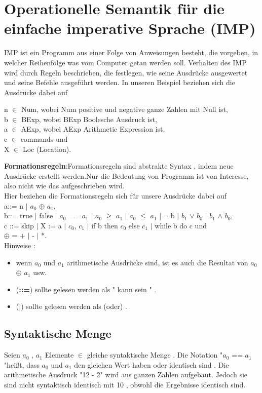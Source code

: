 \documentclass[a4paper,12pt,twoside,headsepline]{scrartcl}
\begin{document}
\section{Operationelle Semantik für die einfache imperative Sprache (IMP)}
IMP ist ein Programm aus einer Folge von Anweisungen besteht, die vorgeben, in welcher Reihenfolge was vom Computer getan werden soll.
 Verhalten des IMP  wird durch Regeln beschrieben, die festlegen, wie seine Ausdrücke ausgewertet und seine Befehle ausgeführt werden.
In unseren Beispiel beziehen sich die Ausdrücke dabei auf

n $\in$ Num, wobei Num positive und negative ganze Zahlen mit Null ist,\\
b $\in$ BExp, wobei BExp Boolesche Ausdruck ist,\\
a $\in$ AExp, wobei AExp Arithmetic Expression ist,\\
c $\in$ commands und\\
X $\in$ Loc    (Location).

		
			
\textbf{Formationsregeln}:Formationsregeln sind abstrakte Syntax , indem neue Ausdrücke erstellt werden.Nur die Bedeutung von Programm ist von Interesse, also nicht wie  das aufgeschrieben wird.\\
Hier beziehen die Formationsregeln sich für unsere Ausdrücke dabei auf\\
	
a::= n $\mid$ $a_0$ $\oplus$ $a_1$,\\
b::= true $\mid$ false $\mid$ $a_0$ == $a_1$ $\mid$ $a_0$ $\geq$ $a_1$ $\mid$ $a_0$ $\leq$ $a_1$ $\mid$ $\neg$ b $\mid$ $b_1$ $\vee$ $b_0$ $\mid$ $b_1$ $\wedge$ $b_0$,\\   
c ::= skip $\mid$ X := a $\mid$  $c_0$, $c_1$ $\mid$ if b then $c_0$ else $c_1$ $\mid$ while b do c und \\
$\oplus$ = + $\mid$ - $\mid$ *.	\\
		
Hinweise :
\begin{itemize}
\item wenn $a_0$ und $a_1$ arithmetische Ausdrücke sind, ist es auch die Resultat von $a_0$ $\oplus$ $a_1$ usw. 
\item (\textbf{::=}) sollte gelesen werden als " kann sein " .
		\item (\textbf{$\mid$}) sollte gelesen werden als (oder) .
\end{itemize} 

\subsection{Syntaktische Menge }
Seien $a_0$ , $a_1$ Elemente  $\in$ gleiche syntaktische Menge . Die Notation "$a_0$ == $a_1$"heißt, dass $a_0$ und $a_1$ den gleichen Wert haben oder identisch sind . 
Die  arithmetische Ausdruck "12 - 2"  wird aus ganzen Zahlen aufgebaut. Jedoch sie sind nicht syntaktisch identisch mit 10 , obwohl die Ergebnisse identisch sind.
\end{document}
